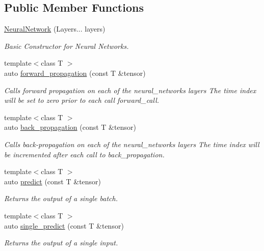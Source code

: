 \subsection*{Public Member Functions}
\begin{DoxyCompactItemize}
\item 
\hyperlink{structbc_1_1nn_1_1NeuralNetwork_aecab2b320ed500b2a097210410605a24}{Neural\+Network} (Layers... layers)
\begin{DoxyCompactList}\small\item\em Basic Constructor for Neural Networks. \end{DoxyCompactList}\item 
{\footnotesize template$<$class T $>$ }\\auto \hyperlink{structbc_1_1nn_1_1NeuralNetwork_af9aa894ca348fd7c44ec248416dcac41}{forward\+\_\+propagation} (const T \&tensor)
\begin{DoxyCompactList}\small\item\em Calls forward propagation on each of the neural\+\_\+network\textquotesingle{}s layers The time index will be set to zero prior to each call forward\+\_\+call. \end{DoxyCompactList}\item 
{\footnotesize template$<$class T $>$ }\\auto \hyperlink{structbc_1_1nn_1_1NeuralNetwork_ab1cda131c79efc9b13d87a0f323c1752}{back\+\_\+propagation} (const T \&tensor)
\begin{DoxyCompactList}\small\item\em Calls back-\/propagation on each of the neural\+\_\+network\textquotesingle{}s layers The time index will be incremented after each call to back\+\_\+propagation. \end{DoxyCompactList}\item 
{\footnotesize template$<$class T $>$ }\\auto \hyperlink{structbc_1_1nn_1_1NeuralNetwork_a3781d20ddd5273b475bbe5abb5fc938d}{predict} (const T \&tensor)
\begin{DoxyCompactList}\small\item\em Returns the output of a single batch. \end{DoxyCompactList}\item 
{\footnotesize template$<$class T $>$ }\\auto \hyperlink{structbc_1_1nn_1_1NeuralNetwork_ac2fbb1a8f2d9cf6cd82427bcf84d79ad}{single\+\_\+predict} (const T \&tensor)
\begin{DoxyCompactList}\small\item\em Returns the output of a single input. \end{DoxyCompactList}\item 

\end{DoxyCompactItemize}
